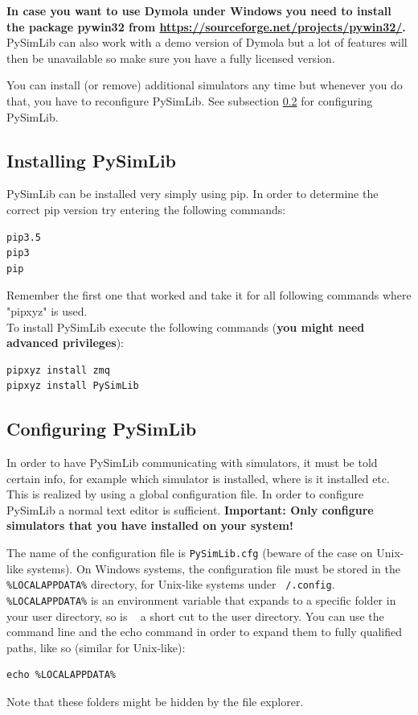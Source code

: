 \textbf{In case you want to use Dymola under Windows you need to install the package \grqq{}pywin32\grqq{} from \url{https://sourceforge.net/projects/pywin32/}.}
PySimLib can also work with a demo version of Dymola but a lot of features will then be unavailable so make sure you have a fully licensed version.

You can install (or remove) additional simulators any time but whenever you do that, you have to reconfigure PySimLib.
See subsection \ref{configuringPySimLib} for configuring PySimLib.





\subsection{Installing PySimLib}

PySimLib can be installed very simply using pip.
In order to determine the correct pip version try entering the following commands:
\lstset{language=bash}
\begin{lstlisting}
pip3.5
pip3
pip
\end{lstlisting}

Remember the first one that worked and take it for all following commands where "pipxyz" is used.
\\
To install PySimLib execute the following commands (\textbf{you might need advanced privileges}):
\begin{lstlisting}
pipxyz install zmq
pipxyz install PySimLib
\end{lstlisting}






\subsection{Configuring PySimLib}
\label{configuringPySimLib}

In order to have PySimLib communicating with simulators, it must be told certain info, for example which simulator is installed, where is it installed etc.
This is realized by using a global configuration file.
In order to configure PySimLib a normal text editor is sufficient.
\textbf{Important: Only configure simulators that you have installed on your system!}

The name of the configuration file is \texttt{PySimLib.cfg} (beware of the case on Unix-like systems).
On Windows systems, the configuration file must be stored in the \texttt{\%LOCALAPPDATA\%} directory, for Unix-like systems under \texttt{~/.config}.
\texttt{\%LOCALAPPDATA\%} is an environment variable that expands to a specific folder in your user directory, so is \grqq{}~\grqq{} a short cut to the user directory.
You can use the command line and the \grqq{}echo\grqq{} command in order to expand them to fully qualified paths, like so (similar for Unix-like):
\lstset{language=bash}
\begin{lstlisting}
echo %LOCALAPPDATA%
\end{lstlisting}
Note that these folders might be hidden by the file explorer.

